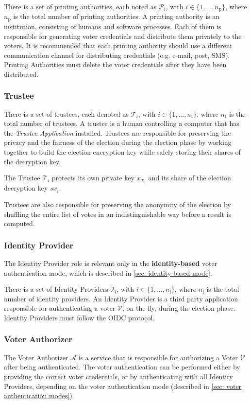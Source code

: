 There is a set of printing authorities, each noted as $\mathcal{P}_i$, with \( i \in \{ 1, ..., n_\mathrm{p} \} \), where $n_\mathrm{p}$ is the total number of printing authorities. A printing authority is an institution, consisting of humans and software processes. Each of them is responsible for generating voter credentials and distribute them privately to the voters. It is recommended that each printing authority should use a different communication channel for distributing credentials (e.g. e-mail, post, SMS). Printing Authorities must delete the voter credentials after they have been distributed.


\subsubsection{Trustee}
There is a set of trustees, each denoted as $\mathcal{T}_i$, with \( i \in \{ 1, ..., n_\mathrm{t} \} \), where $n_\mathrm{t}$ is the total number of trustees. A trustee is a human controlling a computer that has the \textit{Trustee Application} installed. Trustees are responsible for preserving the privacy and the fairness of the election during the election phase by working together to build the election encryption key while safely storing their shares of the decryption key.

The Trustee $\mathcal{T}_i$ protects its own private key $x_{\mathcal{T}_i}$ and its share of the election decryption key $sx_i$.

Trustees are also responsible for preserving the anonymity of the election by shuffling the entire list of votes in an indistinguishable way before a result is computed.


\subsubsection{Identity Provider}
The Identity Provider role is relevant only in the \textbf{identity-based} voter authentication mode, which is described in \cref{sec: identity-based mode}.
    
There is a set of Identity Providers $\mathcal{I}_i$, with $i \in \{ 1, ..., n_\mathrm{i} \}$, where $n_\mathrm{i}$ is the total number of identity providers. An Identity Provider is a third party application responsible for authenticating a voter $\mathcal{V}$, on the fly, during the election phase. Identity Providers must follow the OIDC protocol.


\subsubsection{Voter Authorizer} 
The Voter Authorizer $\mathcal{A}$ is a service that is responsible for authorizing a Voter $\mathcal{V}$ after being authenticated. The voter authentication can be performed either by providing the correct voter credentials, or by authenticating with all Identity Providers, depending on the voter authentication mode (described in \cref{sec: voter authentication modes}).


